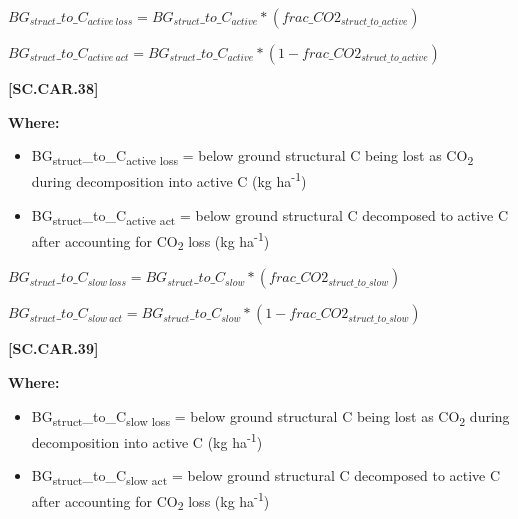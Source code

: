     \begin{center}
\(BG_{struct}\_to\_C_{active\ loss}=BG_{struct}\_to\_C_{active} * (frac\_CO2_{struct\_to\_active})\)
\vspace{0.1cm}

\(BG_{struct}\_to\_C_{active\ act}=BG_{struct}\_to\_C_{active} * (1-frac\_CO2_{struct\_to\_active})\)

    \end{center}
        \vspace{0.5cm} 
    
            {\raggedleft \textbf{[SC.CAR.38]}\par}
            \vspace{0.5cm}

        \textbf{Where:}
            
        \begin{itemize}
            \item BG\textsubscript{struct}\_to\_C\textsubscript{active loss} = below ground structural C being lost as CO\textsubscript{2} during  decomposition into active C (kg ha\textsuperscript{-1})
            \item BG\textsubscript{struct}\_to\_C\textsubscript{active act} = below ground structural C decomposed to active C after accounting for CO\textsubscript{2} loss (kg ha\textsuperscript{-1})
        \end{itemize}
        \vspace{0.5cm}

    \begin{center}
\(BG_{struct}\_to\_C_{slow\ loss}=BG_{struct}\_to\_C_{slow} * (frac\_CO2_{struct\_to\_slow})\)
\vspace{0.1cm}

\(BG_{struct}\_to\_C_{slow\ act}=BG_{struct}\_to\_C_{slow} * (1-frac\_CO2_{struct\_to\_slow})\)

    \end{center}
        \vspace{0.5cm} 
    
            {\raggedleft \textbf{[SC.CAR.39]}\par}
            \vspace{0.5cm}

        \textbf{Where:}
            
        \begin{itemize}
            \item BG\textsubscript{struct}\_to\_C\textsubscript{slow loss} = below ground structural C being lost as CO\textsubscript{2} during  decomposition into active C (kg ha\textsuperscript{-1})
            \item BG\textsubscript{struct}\_to\_C\textsubscript{slow act} = below ground structural C decomposed to active C after accounting for CO\textsubscript{2} loss (kg ha\textsuperscript{-1})
        \end{itemize}
        \vspace{0.5cm}

